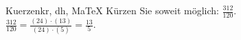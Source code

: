 \begin{MAufgabe}{Kuerzen}{kr, dh, MaTeX}
K\"urzen Sie soweit m\"oglich: $\frac{312}{120}$.\\ 
\ifLsg\MLoesung
\quad $\frac{312}{120}=\frac{(24)\cdot(13)}{(24)\cdot(5)}=\frac{13}{5}$.\else\relax\fi
 \end{MAufgabe}